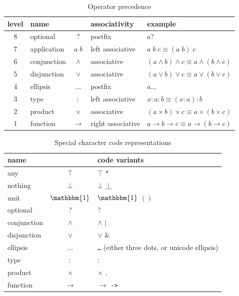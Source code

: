 \documentclass[10pt]{article}
\begin{document}
\begin{table}[ht]
\begin{center}
\begin{tabular}{clcll}
level & name & & associativity & example \\
\hline
8 & optional     & $?$      & postfix            & $a?$ \\
7 & application  & $a\;b$   & left associative   & $a\;b\;c \equiv (a\;b)\;c$ \\ 
6 & conjunction  & $\land$  & associative        & $(a \land b) \land c \equiv a \land (b \land c)$ \\
5 & disjunction  & $\lor$   & associative        & $(a \lor b) \lor c \equiv a \lor (b \lor c)$ \\
4 & ellipsis     & $\ldots$ & postfix            & $a \ldots$ \\
3 & type         & $:$      & left associative   & $x : a : b \equiv (x : a) : b$ \\
2 & product      & $\times$ & associative        & $(a \times b) \times c \equiv a \times (b \times c)$ \\
1 & function     & $\to$    & right associative  & $a \to b \to c \equiv a \to (b \to c)$ \\
\end{tabular}
\end{center}
\caption{Operator precedence}
\end{table}


\begin{table}[ht]
\begin{center}
\begin{tabular}{lcl}
name & & code variants \\
\hline
any          & $\top$   & $\top$ $\mathtt{*}$ \\
nothing      & $\bot$   & $\bot$ $\mathtt{\_|\_}$ \\
unit         & $\mathbbm{1}$ & $\mathbbm{1}$ $\mathtt{()}$ \\
optional     & $?$      & $\mathtt{?}$ \\
conjunction  & $\land$  & $\land$ $\mathtt{|}$ \\
disjunction  & $\lor$   & $\lor$ $\mathtt{\&}$ \\
ellipsis     & $\ldots$ & \texttt{\ldots} (either three dots, or unicode ellipsis) \\
type         & $:$      & $\mathtt{:}$ \\
product      & $\times$ & $\times$ $\mathtt{,}$ \\
function     & $\to$    & $\to$ \texttt{->} \\
\end{tabular}
\end{center}
\caption{Special character code representations}
\end{table}
\end{document}
